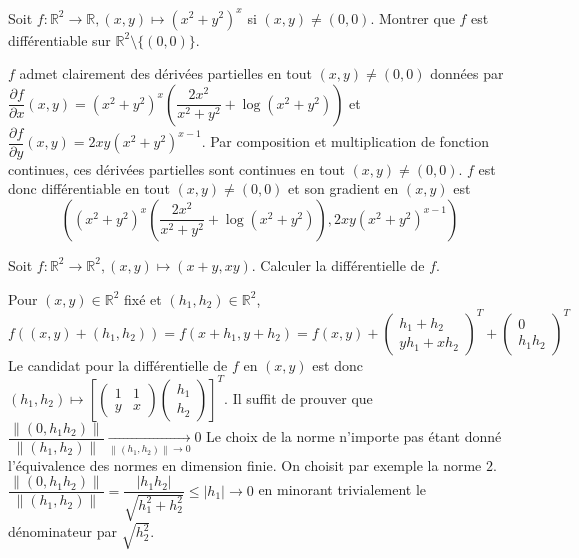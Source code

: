 \documentclass{fancybook}
\begin{document}
\begin{exercice}
Soit $f:\mathbb R^2\to \mathbb R, (x,y)\mapsto (x^2+y^2)^x$ si $(x,y)\neq (0,0)$.\newline
Montrer que $f$ est différentiable sur $\mathbb R^2\setminus \{(0,0)\}$.
\end{exercice}
$f$ admet clairement des dérivées partielles en tout $(x,y)\neq (0,0)$ données par $\dfrac{\partial f}{\partial x}(x,y) = \left(x^2+y^2\right)^x \left(\dfrac{2 x^2}{x^2+y^2}+\log \left(x^2+y^2\right)\right)$ et $\dfrac{\partial f}{\partial y}(x,y) = 2 x y \left(x^2+y^2\right)^{x-1}$.\newline
Par composition et multiplication de fonction continues, ces dérivées partielles sont continues en tout $(x,y)\neq (0,0)$.\newline
$f$ est donc différentiable en tout $(x,y)\neq (0,0)$ et son gradient en $(x,y)$ est $$\left(\left(x^2+y^2\right)^x \left(\dfrac{2 x^2}{x^2+y^2}+\log \left(x^2+y^2\right)\right),2 x y \left(x^2+y^2\right)^{x-1}\right)$$

\begin{exercice}
Soit $f:\mathbb R^2\to \mathbb R^2, (x,y)\mapsto (x+y,xy)$.
Calculer la différentielle de $f$.
\end{exercice}
Pour $(x,y)\in \mathbb R^2$ fixé et $(h_1,h_2)\in \mathbb R^2$, \newline 
$f((x,y)+(h_1,h_2))=f(x+h_1,y+h_2)=f(x,y)+\begin{pmatrix}
h_1+h_2 \\ yh_1 + xh_2
\end{pmatrix}^T + \begin{pmatrix}
0 \\ h_1 h_2
\end{pmatrix}^T$\newline
Le candidat pour la différentielle de $f$ en $(x,y)$ est donc $(h_1,h_2)\mapsto \left[\begin{pmatrix}
1 & 1\\
y & x 
\end{pmatrix} \begin{pmatrix}
h_1 \\ h_2
\end{pmatrix}\right]^T$. \newline
Il suffit de prouver que $\displaystyle \dfrac{\left\|(0,h_1h_2)\right\|}{\left\| 
(h_1, h_2)\right\|}\xrightarrow[\left\| 
(h_1, h_2)\right\|\to 0]{}0$\newline 
Le choix de la norme n'importe pas étant donné l'équivalence des normes en dimension finie. On choisit par exemple la norme $2$.\newline
$\displaystyle \dfrac{\left\|(0,h_1h_2)\right\|}{\left\| 
(h_1, h_2)\right\|} = \dfrac{|h_1 h_2|}{\sqrt{h^2_1+h^2_2}}\leq |h_1|\to 0$ \newline  en minorant trivialement le dénominateur par $\sqrt {h^2_2}$.
\end{document}
